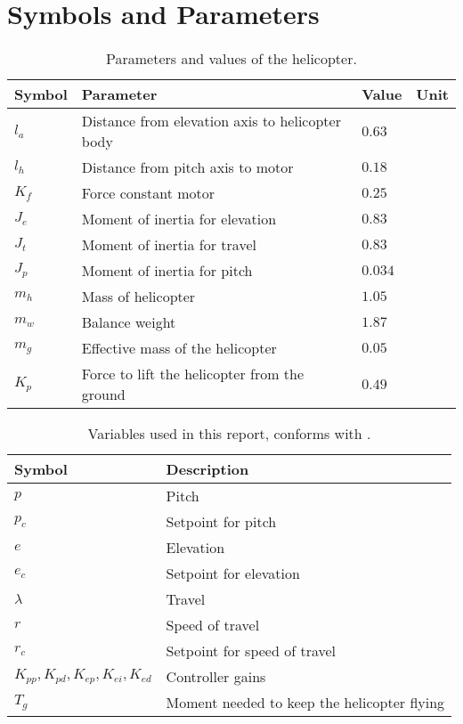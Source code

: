 \section{Symbols  and Parameters}
\begin{table}[h]
	\centering
	\caption{Parameters and values of the helicopter. \citep{labex}}
	\begin{tabular}{llll}
		\toprule
		Symbol & Parameter & Value & Unit \\
		\midrule
		$l_a$ & Distance from elevation axis to helicopter body & $0.63$ & \meter \\
		$l_h$ & Distance from pitch axis to motor & $0.18$ & \meter \\
		$K_f$ & Force constant motor & $0.25$ & \newton\per\volt \\
		$J_e$ & Moment of inertia for elevation & $0.83$ & \kilogram\usk\square\meter \\
		$J_t$ & Moment of inertia for travel & $0.83$ & \kilogram\usk\square\meter \\
		$J_p$ & Moment of inertia for pitch & $0.034$ & \kilogram\usk\square\meter \\
		$m_h$ & Mass of helicopter & $1.05$ & \kilogram \\
		$m_w$ & Balance weight & $1.87$ & \kilogram \\
		$m_g$ & Effective mass of the helicopter & $0.05$ & \kilogram \\
		$K_p$ & Force to lift the helicopter from the ground & $0.49$ & \newton \\
		\bottomrule
	\end{tabular}
	\label{tab:parameters}
\end{table}

\begin{table}[h]
	\centering
	\caption{Variables used in this report, conforms with \citep{labex}.}
	\begin{tabular}{ll}
		\toprule
		Symbol & Description \\
		\midrule
		$p$ & Pitch\\
		$p_c$ & Setpoint for pitch\\
		$e$ & Elevation\\
		$e_c$ & Setpoint for elevation\\
		$\lambda$ & Travel\\
		$r$ & Speed of travel\\
		$r_c$ & Setpoint for speed of travel\\
		$K_{pp}, K_{pd}, K_{ep}, K_{ei}, K_{ed}$ & Controller gains\\
		$T_g$ & Moment needed to keep the helicopter flying\\
		\bottomrule
	\end{tabular}
	\label{tab:variables}
\end{table}
